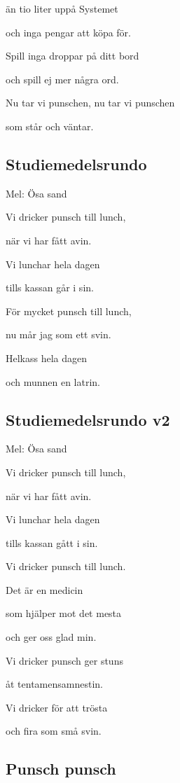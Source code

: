 än tio liter uppå Systemet

och inga pengar att köpa för.

Spill inga droppar på ditt bord

och spill ej mer några ord.

Nu tar vi punschen, nu tar vi punschen

som står och väntar.


\subsection{\textbf{Studiemedelsrundo}}

Mel: Ösa sand\bigskip


Vi dricker punsch till lunch,

när vi har fått avin.

Vi lunchar hela dagen

tills kassan går i sin.\bigskip

För mycket punsch till lunch,

nu mår jag som ett svin.

Helkass hela dagen

och munnen en latrin.

\subsection{\textbf{Studiemedelsrundo v2}}

Mel: Ösa sand\bigskip

Vi dricker punsch till lunch,

när vi har fått avin.

Vi lunchar hela dagen

tills kassan gått i sin.\bigskip

Vi dricker punsch till lunch.

Det är en medicin

som hjälper mot det mesta

och ger oss glad min.\bigskip

Vi dricker punsch ger stuns

åt tentamensamnestin.

Vi dricker för att trösta

och fira som små svin.\bigskip

\subsection{\textbf{Punsch punsch}}

